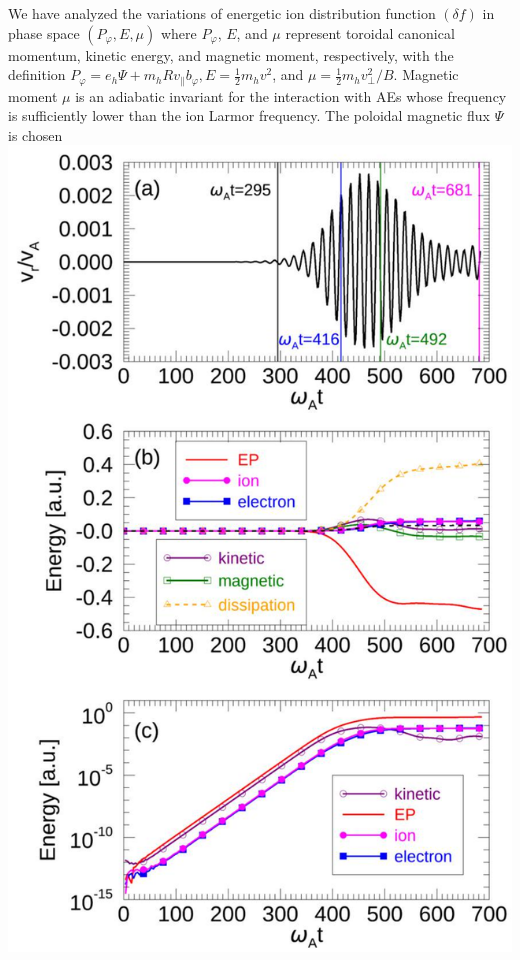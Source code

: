 \documentclass[10pt]{article}
\begin{document}
We have analyzed the variations of energetic ion distribution function $(\delta f)$ in phase space $\left(P_{\varphi}, E, \mu\right)$ where $P_{\varphi}$, $E$, and $\mu$ represent toroidal canonical momentum, kinetic energy, and magnetic moment, respectively, with the definition $P_{\varphi}=e_{h} \Psi+m_{h} R v_{\|} b_{\varphi}, E=\frac{1}{2} m_{h} v^{2}$, and $\mu=\frac{1}{2} m_{h} v_{\perp}^{2} / B$. Magnetic moment $\mu$ is an adiabatic invariant for the interaction with AEs whose frequency is sufficiently lower than the ion Larmor frequency. The poloidal magnetic flux $\Psi$ is chosen
\includegraphics[max width=\textwidth, center]{2023_06_04_de2f4b8aa3fd859f006dg-06}
\end{document}
